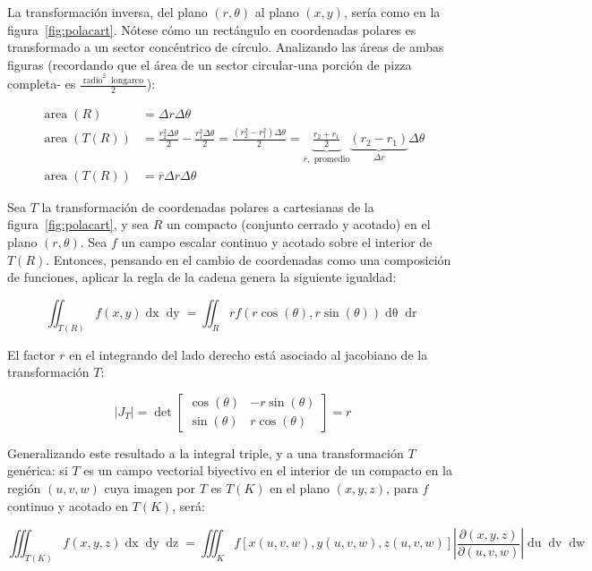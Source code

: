 \documentclass{article}
\begin{document}
La transformación inversa, del plano $(r, \theta)$ al plano $(x,y)$, sería como en la figura~\ref{fig:polacart}. Nótese cómo un rectángulo en coordenadas polares es transformado a un sector concéntrico de círculo. Analizando las áreas de ambas figuras (recordando que el área de un sector circular-una porción de pizza completa- es $ \frac{ \mathop{radio}^2 \mathop{longarco} }{2} $):

\begin{align}
\mathop{area}(R) &= \Delta r \Delta \theta \\
\mathop{area}(T(R)) &= \frac{r_2^2 \Delta \theta}{2} - \frac{r_1^2 \Delta \theta}{2} = \frac{(r_2^2 - r_1^2) \Delta \theta}{2} = \underbrace{ \frac{r_2 + r_1}{2} }_{\overline{r}, \text{ promedio}} \underbrace{ (r_2 - r_1) }_{\Delta r} \Delta \theta \\
\mathop{area}(T(R)) &= \overline{r} \Delta r \Delta \theta
\end{align}

Sea $T$ la transformación de coordenadas polares a cartesianas de la figura~\ref{fig:polacart}, y sea $R$ un compacto (conjunto cerrado y acotado) en el plano $(r,\theta)$. Sea $f$ un campo escalar continuo y acotado sobre el interior de $T(R)$. Entonces, pensando en el cambio de coordenadas como una composición de funciones, aplicar la regla de la cadena genera la siguiente igualdad:

\begin{equation}
\iint_{T(R)} f(x,y) \mathop{dx} \mathop{dy} = \iint_R r f(r \cos(\theta), r \sin(\theta)) \mathop{d\theta} \mathop{dr}
\end{equation}

El factor $r$ en el integrando del lado derecho está asociado al jacobiano de la transformación $T$:

\begin{equation}
|J_T| = \det \begin{bmatrix}
\cos(\theta) & -r \sin(\theta) \\
\sin(\theta) & r \cos(\theta)
\end{bmatrix} = r
\end{equation}

Generalizando este resultado a la integral triple, y a una transformación $T$ genérica: si $T$ es un campo vectorial biyectivo en el interior de un compacto en la región $(u,v,w)$ cuya imagen por $T$ es $T(K)$ en el plano $(x,y,z)$, para $f$ continuo y acotado en $T(K)$, será:

\begin{equation}
\iiint_{T(K)} f(x,y,z) \mathop{dx} \mathop{dy} \mathop{dz} = \iiint_K f[x(u,v,w), y(u,v,w), z(u,v,w)] \left| \frac{\partial(x,y,z)}{\partial(u,v,w)} \right| \mathop{du} \mathop{dv} \mathop{dw}
\end{equation}
\end{document}
